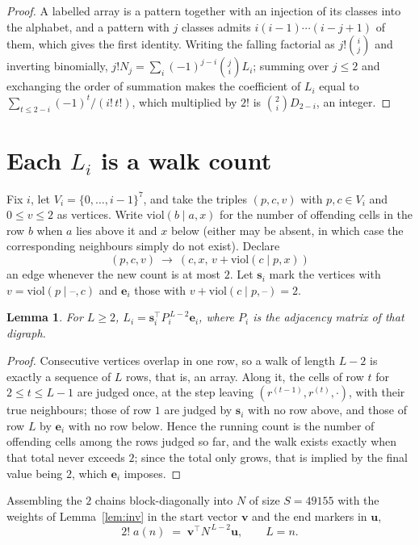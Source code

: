\documentclass[11pt,a4paper]{article}
\theoremstyle{plain}
\newtheorem{lemma}[theorem]{Lemma}
\theoremstyle{definition}
\begin{document}
\begin{proof}
A labelled array is a pattern together with an injection of its classes into the alphabet,
and a pattern with $j$ classes admits $i(i-1)\cdots(i-j+1)$ of them, which gives the first
identity. Writing the falling factorial as $j!\binom{i}{j}$ and inverting binomially,
$j!N_j=\sum_i(-1)^{j-i}\binom{j}{i}L_i$; summing over $j\le2$ and exchanging the
order of summation makes the coefficient of $L_i$ equal to
$\sum_{t\le2-i}(-1)^t/(i!\,t!)$, which multiplied by $2!$ is
$\binom{2}{i}D_{2-i}$, an integer.
\end{proof}

\section{Each $L_i$ is a walk count}

Fix $i$, let $V_i=\{0,\dots,i-1\}^{7}$, and take the triples $(p,c,v)$ with
$p,c\in V_i$ and $0\le v\le2$ as vertices. Write $\mathrm{viol}(b\mid a,x)$ for the number
of offending cells in the row $b$ when $a$ lies above it and $x$ below (either may be
absent, in which case the corresponding neighbours simply do not exist). Declare
\[
(p,c,v)\ \longrightarrow\ (c,x,\,v+\mathrm{viol}(c\mid p,x))
\]
an edge whenever the new count is at most $2$. Let $\mathbf{s}_i$ mark the vertices with
$v=\mathrm{viol}(p\mid\text{--},c)$ and $\mathbf{e}_i$ those with
$v+\mathrm{viol}(c\mid p,\text{--})=2$.

\begin{lemma}\label{lem:walk}
For $L\ge2$, $L_i=\mathbf{s}_i^{\!\top}P_i^{\,L-2}\mathbf{e}_i$, where $P_i$ is the
adjacency matrix of that digraph.
\end{lemma}

\begin{proof}
Consecutive vertices overlap in one row, so a walk of length $L-2$ is exactly a sequence
of $L$ rows, that is, an array. Along it, the cells of row $t$ for $2\le t\le L-1$ are
judged once, at the step leaving $(r^{(t-1)},r^{(t)},\cdot)$, with their true neighbours;
those of row $1$ are judged by $\mathbf{s}_i$ with no row above, and those of row
$L$ by $\mathbf{e}_i$ with no row below. Hence the running count is the number of
offending cells among the rows judged so far, and the walk exists exactly when that total
never exceeds $2$; since the total only grows, that is implied by the final value being
$2$, which $\mathbf{e}_i$ imposes.
\end{proof}

Assembling the $2$ chains block-diagonally into $N$ of size $S=49155$ with the weights of
Lemma~\ref{lem:inv} in the start vector $\mathbf{v}$ and the end markers in
$\mathbf{u}$,
\begin{equation}\label{eq:walk2}
2!\;a(n)\;=\;\mathbf{v}^{\!\top}N^{\,L-2}\mathbf{u},\qquad L=n .
\end{equation}
\end{document}
